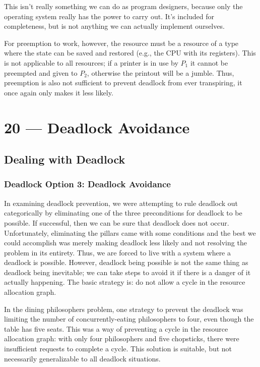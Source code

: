 \documentclass[a4paper]{report}
\begin{document}
This isn't really something we can do as program designers, because only the operating system really has the power to carry out. It's included for completeness, but is not anything we can actually implement ourselves.

For preemption to work, however, the resource must be a resource of a type where the state can be saved and restored (e.g., the CPU with its registers). This is not applicable to all resources; if a printer is in use by $P_{1}$ it cannot be preempted and given to $P_{2}$, otherwise the printout will be a jumble. Thus, preemption is also not sufficient to prevent deadlock from ever transpiring, it once again only makes it less likely.









\chapter*{20 --- Deadlock Avoidance}


\section*{Dealing with Deadlock}

\subsection*{Deadlock Option 3: Deadlock Avoidance}
In examining deadlock prevention, we were attempting to rule deadlock out categorically by eliminating one of the three preconditions for deadlock to be possible. If successful, then we can be sure that deadlock does not occur. Unfortunately, eliminating the pillars came with some conditions and the best we could accomplish was merely making deadlock less likely and not resolving the problem in its entirety. Thus, we are forced to live with a system where a deadlock is possible. However, deadlock being possible is not the same thing as deadlock being inevitable; we can take steps to avoid it if there is a danger of it actually happening. The basic strategy is: do not allow a cycle in the resource allocation graph.

In the dining philosophers problem, one strategy to prevent the deadlock was limiting the number of concurrently-eating philosophers to four, even though the table has five seats. This was a way of preventing a cycle in the resource allocation graph: with only four philosophers and five chopsticks, there were insufficient requests to complete a cycle. This solution is suitable, but not necessarily generalizable to all deadlock situations.
\end{document}
